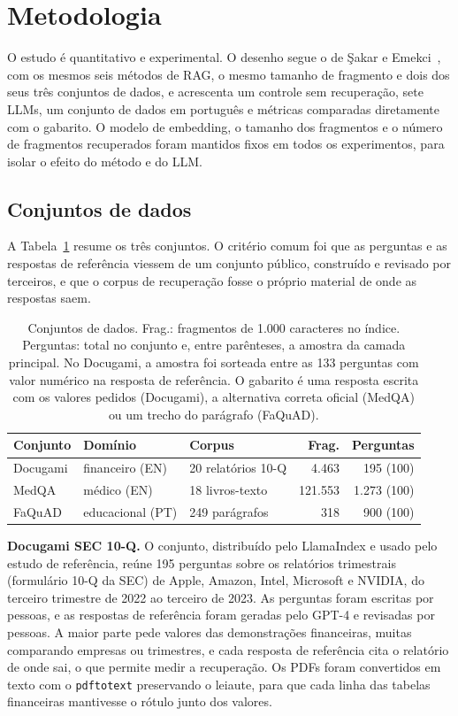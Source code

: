 \section{Metodologia}
\label{sc:metodologia}

O estudo é quantitativo e experimental. O desenho segue o de Şakar e Emekci~\cite{sakar2025rag}, com os mesmos seis métodos de RAG, o mesmo tamanho de fragmento e dois dos seus três conjuntos de dados, e acrescenta um controle sem recuperação, sete LLMs, um conjunto de dados em português e métricas comparadas diretamente com o gabarito. O modelo de embedding, o tamanho dos fragmentos e o número de fragmentos recuperados foram mantidos fixos em todos os experimentos, para isolar o efeito do método e do LLM.

\subsection{Conjuntos de dados}

A Tabela~\ref{tab:datasets} resume os três conjuntos. O critério comum foi que as perguntas e as respostas de referência viessem de um conjunto público, construído e revisado por terceiros, e que o corpus de recuperação fosse o próprio material de onde as respostas saem.

\begin{table}[!t]
\centering
\footnotesize
\setlength{\tabcolsep}{2.5pt}
\caption{Conjuntos de dados. Frag.: fragmentos de 1.000 caracteres no índice. Perguntas: total no conjunto e, entre parênteses, a amostra da camada principal. No Docugami, a amostra foi sorteada entre as 133 perguntas com valor numérico na resposta de referência. O gabarito é uma resposta escrita com os valores pedidos (Docugami), a alternativa correta oficial (MedQA) ou um trecho do parágrafo (FaQuAD).}
\label{tab:datasets}
\begin{tabular}{lllrr}
\toprule
Conjunto & Domínio & Corpus & Frag. & Perguntas \\
\midrule
Docugami & financeiro (EN) & 20 relatórios 10-Q & 4.463 & 195 (100) \\
MedQA & médico (EN) & 18 livros-texto & 121.553 & 1.273 (100) \\
FaQuAD & educacional (PT) & 249 parágrafos & 318 & 900 (100) \\
\bottomrule
\end{tabular}
\end{table}

\textbf{Docugami SEC 10-Q.} O conjunto, distribuído pelo LlamaIndex \cite{docugami2024kgrag} e usado pelo estudo de referência, reúne 195 perguntas sobre os relatórios trimestrais (formulário 10-Q da SEC) de Apple, Amazon, Intel, Microsoft e NVIDIA, do terceiro trimestre de 2022 ao terceiro de 2023. As perguntas foram escritas por pessoas, e as respostas de referência foram geradas pelo GPT-4 e revisadas por pessoas. A maior parte pede valores das demonstrações financeiras, muitas comparando empresas ou trimestres, e cada resposta de referência cita o relatório de onde sai, o que permite medir a recuperação. Os PDFs foram convertidos em texto com o \texttt{pdftotext} preservando o leiaute, para que cada linha das tabelas financeiras mantivesse o rótulo junto dos valores.

